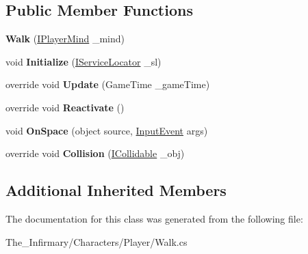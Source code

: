 \subsection*{Public Member Functions}
\begin{DoxyCompactItemize}
\item 
\mbox{\label{class_the___infirmary_1_1_characters_1_1_player_1_1_walk_ad6220b103c2f0893352d8b11edf81f13}} 
{\bfseries Walk} (\mbox{\hyperlink{interface_g_m_t_b_1_1_interfaces_1_1_i_player_mind}{I\+Player\+Mind}} \+\_\+mind)
\item 
\mbox{\label{class_the___infirmary_1_1_characters_1_1_player_1_1_walk_a08d5a6df6571a251cfb8ead417e73b9b}} 
void {\bfseries Initialize} (\mbox{\hyperlink{interface_g_m_t_b_1_1_interfaces_1_1_i_service_locator}{I\+Service\+Locator}} \+\_\+sl)
\item 
\mbox{\label{class_the___infirmary_1_1_characters_1_1_player_1_1_walk_af18d58c553ec909ec9fb5a43d02793b9}} 
override void {\bfseries Update} (Game\+Time \+\_\+game\+Time)
\item 
\mbox{\label{class_the___infirmary_1_1_characters_1_1_player_1_1_walk_a2232a46c448b95eb95e13d446e6800e7}} 
override void {\bfseries Reactivate} ()
\item 
\mbox{\label{class_the___infirmary_1_1_characters_1_1_player_1_1_walk_a822618908e87387c2e3c6afc08c0728c}} 
void {\bfseries On\+Space} (object source, \mbox{\hyperlink{class_g_m_t_b_1_1_input_system_1_1_input_event}{Input\+Event}} args)
\item 
\mbox{\label{class_the___infirmary_1_1_characters_1_1_player_1_1_walk_a4403970d50899e2b7c5cd6d13a8ead9c}} 
override void {\bfseries Collision} (\mbox{\hyperlink{interface_g_m_t_b_1_1_collision_system_1_1_i_collidable}{I\+Collidable}} \+\_\+obj)
\end{DoxyCompactItemize}
\subsection*{Additional Inherited Members}


The documentation for this class was generated from the following file\+:\begin{DoxyCompactItemize}
\item 
The\+\_\+\+Infirmary/\+Characters/\+Player/Walk.\+cs\end{DoxyCompactItemize}
